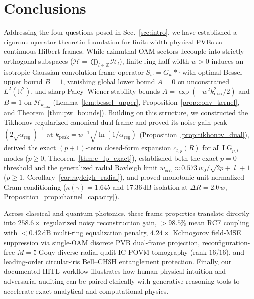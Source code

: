 \documentclass[aps,pra,onecolumn,notitlepage,11pt,tightenlines,amsmath,amssymb,floatfix,longbibliography]{revtex4-2}
\providecommand{\abs}[1]{\lvert#1\rvert}
\begin{document}
\section{Conclusions}
\label{sec:conclusions}

Addressing the four questions posed in Sec.~\ref{sec:intro}, we have established a rigorous operator-theoretic foundation for finite-width physical PVBs as continuous Hilbert frames. While azimuthal OAM sectors decouple into strictly orthogonal subspaces ($\mathcal{H} = \bigoplus_{l\in\mathbb{Z}}\mathcal{H}_l$), finite ring half-width $w > 0$ induces an isotropic Gaussian convolution frame operator $S_w = G_w * \cdot$ with optimal Bessel upper bound $B = 1$, vanishing global lower bound $A = 0$ on unconstrained $L^2(\mathbb{R}^2)$, and sharp Paley--Wiener stability bounds $A = \exp(-w^2 k_{\max}^2/2)$ and $B = 1$ on $\mathcal{H}_{k_{\max}}$ (Lemma~\ref{lem:bessel_upper}, Proposition~\ref{prop:conv_kernel}, and Theorem~\ref{thm:pw_bounds}). Building on this structure, we constructed the Tikhonov-regularized canonical dual frame and proved its noise-gain peak $(2\sqrt{\alpha_{\mathrm{reg}}})^{-1}$ at $k_{\mathrm{peak}} = w^{-1}\sqrt{\ln(1/\alpha_{\mathrm{reg}})}$ (Proposition~\ref{prop:tikhonov_dual}), derived the exact $(p+1)$-term closed-form expansion $c_{l,p}(R)$ for all $\mathrm{LG}_{p,l}$ modes ($p \ge 0$, Theorem~\ref{thm:c_lp_exact}), established both the exact $p = 0$ threshold and the generalized radial Rayleigh limit $w_{\mathrm{crit}} \approx 0.573\,w_0/\sqrt{2p+\abs{l}+1}$ ($p \ge 1$, Corollary~\ref{cor:rayleigh_radial}), and proved monotonic unit-normalized Gram conditioning ($\kappa(\gamma) = 1.645$ and $17.36\,\mathrm{dB}$ isolation at $\Delta R = 2.0\,w$, Proposition~\ref{prop:channel_capacity}).

Across classical and quantum photonics, these frame properties translate directly into $258.6\times$ regularized noisy reconstruction gain, $>98.5\%$ mean RCF coupling with $<0.42\,\mathrm{dB}$ multi-ring equalization penalty, $4.24\times$ Kolmogorov field-MSE suppression via single-OAM discrete PVB dual-frame projection, reconfiguration-free $M = 5$ Gouy-diverse radial-qudit IC-POVM tomography (rank $16/16$), and leading-order circular-iris Bell--CHSH entanglement protection. Finally, our documented HITL workflow illustrates how human physical intuition and adversarial auditing can be paired ethically with generative reasoning tools to accelerate exact analytical and computational physics.
\end{document}
